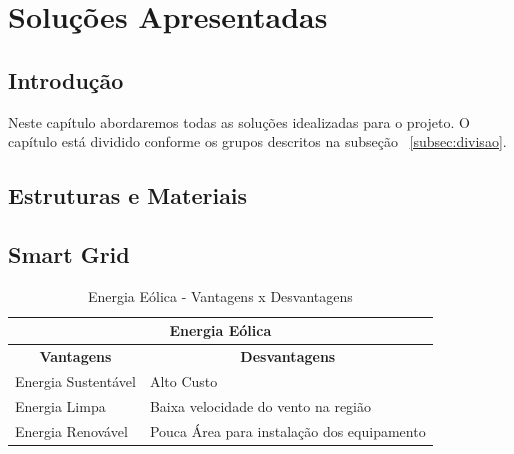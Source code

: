 \part{Soluções Apresentadas}
\chapter[Introdução]{Introdução}
Neste capítulo abordaremos todas as soluções idealizadas para o projeto. O capítulo está dividido conforme os grupos descritos na subseção ~\ref{subsec:divisao}.

\chapter[Estruturas e Materiais]{Estruturas e Materiais}

\chapter[Smart Grid]{Smart Grid}

\begin{table}[h]
  \centering
  \caption{Energia Eólica - Vantagens x Desvantagens}
  \label{my-label}
  \begin{tabular}{|l|l|}
    \hline
    \multicolumn{2}{|c|}{\textbf{Energia Eólica}}                                         \\ \hline
    \multicolumn{1}{|c|}{\textbf{Vantagens}} & \multicolumn{1}{c|}{\textbf{Desvantagens}} \\ \hline
    Energia Sustentável                      & Alto Custo                                 \\ \hline
    Energia Limpa                            & Baixa velocidade do vento na região        \\ \hline
    Energia Renovável                        & Pouca Área para instalação dos equipamento \\ \hline
  \end{tabular}
\end{table}

